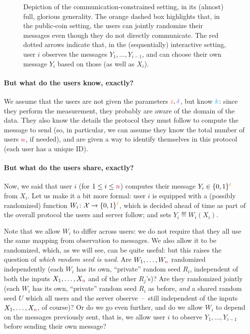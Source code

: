 \begin{figure}\centering

\caption{Depiction of the communication-constrained setting, in its (almost) full, glorious generality. The orange dashed box highlights that, in the public-coin setting, the users can jointly randomize their messages even though they do not directly communicate.   The red dotted arrows indicate that, in the (sequentially) interactive setting, user $i$ observes the messages $Y_1,\dots,Y_{i-1}$, and can choose their own message $Y_i$ based on those (as well as $X_i$).\label{fig:models:distributed}}
\end{figure}

\paragraph{But what do the users know, exactly?} We assume that the users are not given the parameters $\dst,\errprob$, but know ${\textcolor{cyan}{k}}$: since they perform the measurement, they probably are aware of the domain of the data. They also know the details the protocol they must follow to compute the message to send (so, in particular, we can assume they know the total number of users ${\textcolor{purple}{n}}$, if needed), and are given a way to identify themselves in this protocol (\ie each user has a unique ID).

\paragraph{But what do the users share, exactly?} Now, we said that user $i$ (for $1\leq i\leq {\textcolor{purple}{n}}$) computes their message $Y_i\in\{0,1\}^{\textcolor{orange}{\ell}}$ from $X_i$. Let us make it a bit more formal: user $i$ is equipped with a (possibly randomized) function $W_i\colon \mathcal{X}\to\{0,1\}^{\textcolor{orange}{\ell}}$, which is decided ahead of time as part of the overall protocol the users and server follow; and sets $Y_i \eqdef W_i(X_i)$.

Note that we allow $W_i$ to differ across users: we do not require that they all use the same mapping from observation to messages. We also allow it to be randomized, which, as we will see, can be quite useful: but this raises the question of \emph{which random seed is used}. Are $W_1,\dots,W_{\textcolor{purple}{n}}$ randomized independently (\ie each $W_i$ has its own, ``private'' random seed $R_i$, independent of both the inputs $X_1,\dots,X_{\textcolor{purple}{n}}$ and of the other $R_j$'s)? Are they randomized jointly (\ie each $W_i$ has its own, ``private'' random seed $R_i$ as before, \emph{and} a shared random seed $U$ which all users and the server observe~--~still independent of the inputs $X_1,\dots,X_{\textcolor{purple}{n}}$, of course)? Or do we go even further, and do we allow $W_i$ to depend on the messages previously sent, that is, we allow user $i$ to observe $Y_1,\dots,Y_{i-1}$ before sending their own message?

